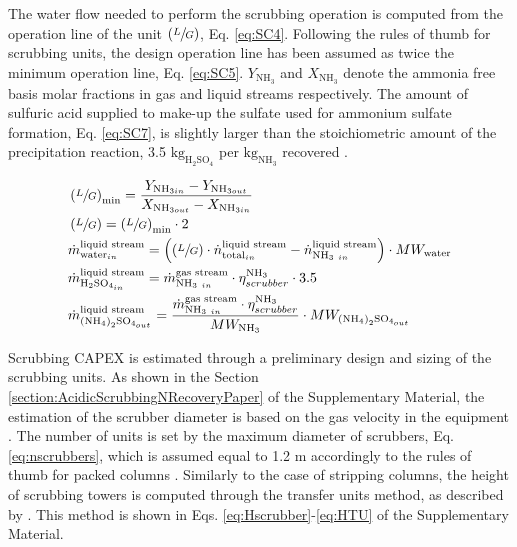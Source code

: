 \begin{refsection}[referencesCh6]
The water flow needed to perform the scrubbing operation is computed from the operation line of the unit $\left(\sfrac{L}{G}\right)$, Eq. \ref{eq:SC4}. Following the rules of thumb for scrubbing units, the design operation line has been assumed as twice the minimum operation line, Eq. \ref{eq:SC5}. $Y_{\text{NH}_3}$ and $X_{\text{NH}_3}$ denote the ammonia free basis molar fractions in gas and liquid streams respectively. The amount of sulfuric acid supplied to make-up the sulfate used for ammonium sulfate formation, Eq. \ref{eq:SC7}, is slightly larger than the stoichiometric amount of the precipitation reaction, 3.5 $\text{kg}_{\text{H}_2 \text{SO}_4}$ per ${\text{kg}_{\text{NH}_3}}$ recovered \citep{bolzonella2018nutrients}.

\begin{align}
& \left(\sfrac{L}{G}\right)_{\text{min}}= \frac{Y_{\text{NH}_{3 in}} - Y_{\text{NH}_{3 out}}}{X_{\text{NH}_{3 out}} - X_{\text{NH}_{3 in}}} \label{eq:SC4} 
\\
& \left(\sfrac{L}{G}\right)= \left(\sfrac{L}{G}\right)_{\text{min}} \cdot 2 \label{eq:SC5} 
\\
& \dot{m}_{\text{water}_{in}}^{\text{liquid stream}} = \left(\left(\sfrac{L}{G}\right) \cdot \dot{n}_{\text{total}_{in}}^{\text{liquid stream}} - \dot{n}_{\text{NH}_{3 \ in}}^{\text{liquid stream}}\right) \cdot MW_{\text{water}} \label{eq:SC6} 
\\
& \dot{m}_{\text{H}_2 \text{SO}_{4_{in}}}^{\text{liquid stream}} = \dot{m}_{\text{NH}_{3 \ in}}^{\text{gas stream}} \cdot \eta_{scrubber}^{\text{NH}_3} \cdot 3.5 \label{eq:SC7} 
\\
& \dot{m}_{\left(\text{NH}_4\right)_2 \text{SO}_{4_{out}}}^{\text{liquid stream}} = \frac{\dot{m}_{\text{NH}_{3 \ in}}^{\text{gas stream}} \cdot \eta_{scrubber}^{\text{NH}_3}}{MW_{\text{NH}_3}} \cdot MW_{\left(\text{NH}_4\right)_2 \text{SO}_{4_{out}}} \label{eq:SC8} 
\end{align}

Scrubbing CAPEX is estimated through a preliminary design and sizing of the scrubbing units. As shown in the
Section \ref{section:AcidicScrubbingNRecoveryPaper} of the Supplementary Material,
the estimation of the scrubber diameter is based on the gas velocity in the equipment \citep{melse2005}. The number of units is set by the maximum diameter of scrubbers, Eq. \ref{eq:nscrubbers}, which is assumed equal to 1.2 m accordingly to the rules of thumb for packed columns \citep{Branan}. Similarly to the case of stripping columns, the height of scrubbing towers is computed through the transfer units method, as described by \citet{couper2005chemical}. This method is shown in
Eqs. \ref{eq:Hscrubber}-\ref{eq:HTU} of the Supplementary Material.


\end{refsection}
